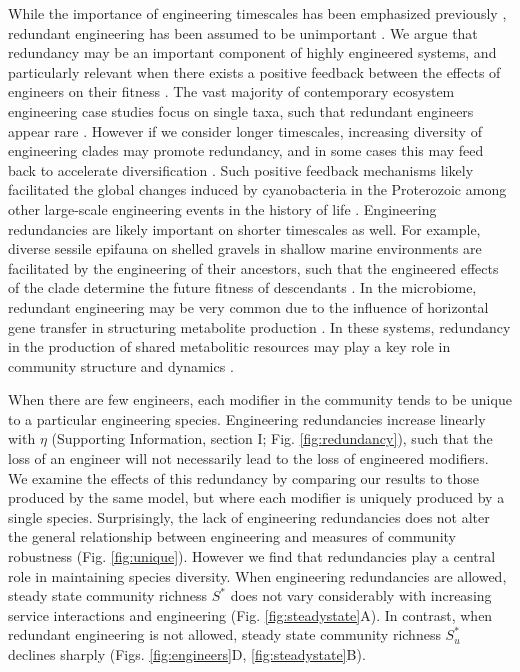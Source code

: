 \documentclass[twocolumn,preprintnumbers,amsmath,amssymb,superscriptaddress]{revtex4}
\begin{document}
While the importance of engineering timescales has been emphasized previously \cite{Hastings2007}, redundant engineering has been assumed to be unimportant \cite{Lawton1994}.
We argue that redundancy may be an important component of highly engineered systems, and particularly relevant when there exists a positive feedback between the effects of engineers on their fitness \cite{Cuddington2004}.
The vast majority of contemporary ecosystem engineering case studies focus on single taxa, such that redundant engineers appear rare \cite{Lawton1994}.
However if we consider longer timescales, increasing diversity of engineering clades may promote redundancy, and in some cases this may feed back to accelerate diversification \cite{OdlingSmee2013b}.
Such positive feedback mechanisms likely facilitated the global changes induced by cyanobacteria in the Proterozoic \cite{Erwin2008,Schirrmeister2013} among other large-scale engineering events in the history of life \cite{Erwin2008}.
Engineering redundancies are likely important on shorter timescales as well.
For example, diverse sessile epifauna on shelled gravels in shallow marine environments are facilitated by the engineering of their ancestors, such that the engineered effects of the clade determine the future fitness of descendants \cite{Kidwell1986}.
In the microbiome, redundant engineering may be very common due to the influence of horizontal gene transfer in structuring metabolite production \cite{Polz2013}.
In these systems, redundancy in the production of shared metabolitic resources may play a key role in community structure and dynamics \cite{Kallus2017,Muscarella2017}.




When there are few engineers, each modifier in the community tends to be unique to a particular engineering species.
Engineering redundancies increase linearly with $\eta$ (Supporting Information, section I; Fig. \ref{fig:redundancy}), such that the loss of an engineer will not necessarily lead to the loss of engineered modifiers. %
We examine the effects of this redundancy by comparing our results to those produced by the same model, but where each modifier is uniquely produced by a single species.
Surprisingly, the lack of engineering redundancies does not alter the general relationship between engineering and measures of community robustness (Fig. \ref{fig:unique}).
However we find that redundancies play a central role in maintaining species diversity.
When engineering redundancies are allowed, steady state community richness $S^*$ does not vary considerably with increasing service interactions and engineering (Fig. \ref{fig:steadystate}A).
In contrast, when redundant engineering is not allowed, steady state community richness $S^*_u$ declines sharply (Figs. \ref{fig:engineers}D, \ref{fig:steadystate}B).
\end{document}
